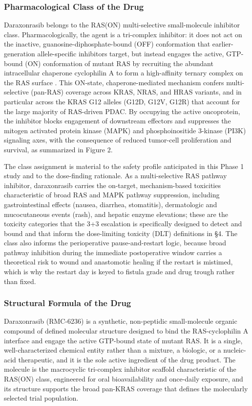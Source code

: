 \subsubsection{Pharmacological Class of the Drug}

Daraxonrasib belongs to the RAS(ON) multi-selective small-molecule inhibitor class.
Pharmacologically, the agent is a tri-complex inhibitor: it does not act on the
inactive, guanosine-diphosphate-bound (OFF) conformation that earlier-generation
allele-specific inhibitors target, but instead engages the active, GTP-bound (ON)
conformation of mutant RAS by recruiting the abundant intracellular chaperone
cyclophilin A to form a high-affinity ternary complex on the RAS surface
\cite{daraxwhipple, onpremwhippl}. This ON-state, chaperone-mediated mechanism
confers multi-selective (pan-RAS) coverage across KRAS, NRAS, and HRAS variants,
and in particular across the KRAS G12 alleles (G12D, G12V, G12R) that account for
the large majority of RAS-driven PDAC. By occupying the active oncoprotein, the
inhibitor blocks engagement of downstream effectors and suppresses the mitogen
activated protein kinase (MAPK) and phosphoinositide 3-kinase (PI3K) signaling
axes, with the consequence of reduced tumor-cell proliferation and survival, as
summarized in Figure 2.

The class assignment is material to the safety profile anticipated in this Phase 1
study and to the dose-finding rationale. As a multi-selective RAS pathway
inhibitor, daraxonrasib carries the on-target, mechanism-based toxicities
characteristic of broad RAS and MAPK pathway suppression, including
gastrointestinal effects (nausea, diarrhea, stomatitis), dermatologic and
mucocutaneous events (rash), and hepatic enzyme elevations; these are the toxicity
categories that the 3+3 escalation is specifically designed to detect and bound and
that inform the dose-limiting toxicity (DLT) definitions in \S 4. The class also
informs the perioperative pause-and-restart logic, because broad pathway inhibition
during the immediate postoperative window carries a theoretical risk to wound and
anastomotic healing if the restart is mistimed, which is why the restart day is
keyed to fistula grade and drug trough rather than fixed.

\subsubsection{Structural Formula of the Drug}

Daraxonrasib (RMC-6236) is a synthetic, non-peptidic small-molecule organic
compound of defined molecular structure designed to bind the RAS-cyclophilin A
interface and engage the active GTP-bound state of mutant RAS. It is a single,
well-characterized chemical entity rather than a mixture, a biologic, or a
nucleic-acid therapeutic, and it is the sole active ingredient of the drug product.
The molecule is the macrocyclic tri-complex inhibitor scaffold characteristic of
the RAS(ON) class, engineered for oral bioavailability and once-daily exposure, and
its structure supports the broad pan-KRAS coverage that defines the molecularly
selected trial population.

